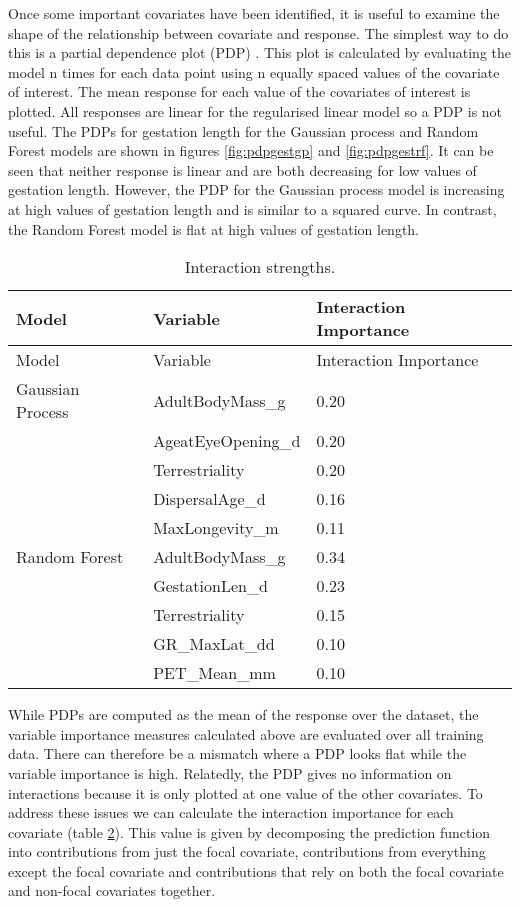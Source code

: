 \documentclass[10pt,]{article}
\begin{document}
Once some important covariates have been identified, it is useful to examine the shape of the relationship between covariate and response. The simplest way to do this is a partial dependence plot (PDP) \citep{friedman2001greedy}. This plot is calculated by evaluating the model n times for each data point using n equally spaced values of the covariate of interest. The mean response for each value of the covariates of interest is plotted. All responses are linear for the regularised linear model so a PDP is not useful. The PDPs for gestation length for the Gaussian process and Random Forest models are shown in figures \ref{fig:pdpgestgp} and \ref{fig:pdpgestrf}. It can be seen that neither response is linear and are both decreasing for low values of gestation length. However, the PDP for the Gaussian process model is increasing at high values of gestation length and is similar to a squared curve. In contrast, the Random Forest model is flat at high values of gestation length.

\begin{table}[t!]
\begin{longtable}[c]{@{}lll@{}}
\caption{Interaction strengths. \label{tbl:interimp}}\tabularnewline
\toprule
Model & Variable & Interaction Importance\tabularnewline
\midrule
\endfirsthead
\toprule
Model & Variable & Interaction Importance\tabularnewline
\midrule
\endhead
Gaussian Process & AdultBodyMass\_g & 0.20\tabularnewline
& AgeatEyeOpening\_d & 0.20\tabularnewline
& Terrestriality & 0.20\tabularnewline
& DispersalAge\_d & 0.16\tabularnewline
& MaxLongevity\_m & 0.11\tabularnewline
Random Forest & AdultBodyMass\_g & 0.34\tabularnewline
& GestationLen\_d & 0.23\tabularnewline
& Terrestriality & 0.15\tabularnewline
& GR\_MaxLat\_dd & 0.10\tabularnewline
& PET\_Mean\_mm & 0.10\tabularnewline
\bottomrule
\end{longtable}
\end{table}



While PDPs are computed as the mean of the response over the dataset, the variable importance measures calculated above are evaluated over all training data. There can therefore be a mismatch where a PDP looks flat while the variable importance is high. Relatedly, the PDP gives no information on interactions because it is only plotted at one value of the other covariates. To address these issues we can calculate the interaction importance for each covariate (table \ref{tbl:interimp}). This value is given by decomposing the prediction function into contributions from just the focal covariate, contributions from everything except the focal covariate and contributions that rely on both the focal covariate and non-focal covariates together.
\end{document}
